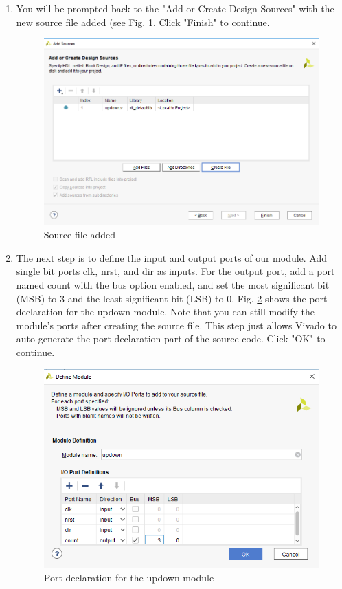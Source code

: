 \documentclass{article}
\begin{document}
\begin{enumerate}
    \item You will be prompted back to the "Add or Create Design Sources" with the new source file added (see Fig. \ref{fig:14-add_source_done}. 
    Click "Finish" to continue.
      \begin{figure}[h!]
        \centering
        \includegraphics[width=0.5\linewidth]{img/program/14-add_source_done.png}
        \caption{Source file added}
        \label{fig:14-add_source_done}
      \end{figure}

    \item The next step is to define the input and output ports of our module. Add single bit ports clk, nrst, and dir as inputs. For the output port, 
    add a port named count with the bus option enabled, and set the most significant bit (MSB) to 3 and the least significant bit (LSB) to 0. Fig. 
    \ref{fig:15-define_module} shows the port declaration for the updown module. Note that you can still modify the module's ports after creating the source 
    file. This step just allows Vivado to auto-generate the port declaration part of the source code. Click "OK" to continue.
      \begin{figure}[h!]
        \centering
        \includegraphics[width=0.5\linewidth]{img/program/15-define_module.png}
        \caption{Port declaration for the updown module}
        \label{fig:15-define_module}
      \end{figure}
    

\end{enumerate}
\end{document}
